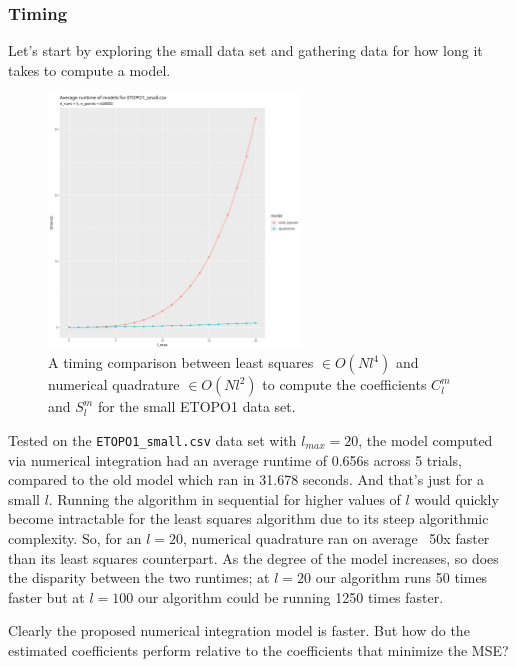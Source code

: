 \documentclass[a4paper]{article}
\theoremstyle{definition}
\begin{document}
\subsubsection{Timing}
Let's start by exploring the small data set and gathering data for how long it takes to compute a model.


\begin{figure}[h!]
    \centering
    \includegraphics[width=0.6\textwidth]{media/average_runtime.png}
    \caption{A timing comparison between least squares $\in O(Nl^4)$ and numerical quadrature $\in O(Nl^2)$ to compute the coefficients $C_l^m$ and $S_l^m$ for the small ETOPO1 data set.}
    \label{fig:runtime}
\end{figure}


Tested on the \verb|ETOPO1_small.csv| data set with $l_{max} = 20$, the model computed via numerical integration had an average runtime of 0.656s across 
5 trials, compared to the old model which ran in 31.678 seconds. And that's just for a small $l$. Running the algorithm in sequential for higher values of $l$ would quickly become
intractable for the least squares algorithm due to its steep algorithmic complexity. So, for an $l = 20$, numerical quadrature ran on average ~50x faster than its least squares counterpart. As the degree
of the model increases, so does the disparity between the two runtimes; at $l=20$ our algorithm runs 50 times faster but at $l = 100$ our algorithm could be running 1250 times faster.

Clearly the proposed numerical integration model is faster. But how do the estimated coefficients perform relative to the coefficients that minimize the MSE?

\end{document}
